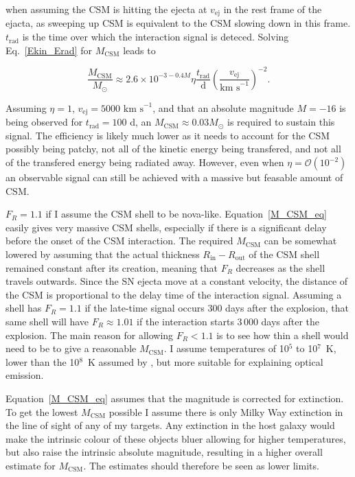\documentclass[a4paper,oneside,12pt, class=Latex/Classes/PhDthesisPSnPDF, crop=false]{standalone}
\begin{document}
when assuming the CSM is hitting the ejecta at $v_\text{ej}$ in the rest frame of the ejacta, as sweeping up CSM is equivalent to the CSM slowing down in this frame. $t_\text{rad}$ is the time over which the interaction signal is deteced. Solving Eq.~\ref{Ekin_Erad} for $M_\text{CSM}$ leads to

\begin{equation}
    \frac{M_\text{CSM}}{M_\odot} \approx 2.6\times 10^{-3-0.4M} \eta \frac{t_\text{rad}}{\text{d}}\left(\frac{v_\text{ej}}{\text{km s}^{-1}}\right)^{-2}.
\end{equation}

Assuming $\eta=1$, $v_\text{ej} = 5000\text{ km s}^{-1}$, and that an absolute magnitude $M=-16$ is being observed for $t_\text{rad}=100$ d, an $M_\text{CSM} \approx 0.03 M_\odot$ is required to sustain this signal. The efficiency is likely much lower as it needs to account for the CSM possibly being patchy, not all of the kinetic energy being transfered, and not all of the transfered energy being radiated away. However, even when $\eta = \mathcal{O}(10^{-2})$ an observable signal can still be achieved with a massive but feasable amount of CSM.

$F_R=1.1$ if I assume the CSM shell to be nova-like. Equation~\ref{M_CSM_eq} easily gives very massive CSM shells, especially if there is a significant delay before the onset of the CSM interaction. The required $M_\text{CSM}$ can be somewhat lowered by assuming that the actual thickness $R_\text{in} - R_\text{out}$ of the CSM shell remained constant after its creation, meaning that $F_R$ decreases as the shell travels outwards. Since the SN ejecta move at a constant velocity, the distance of the CSM is proportional to the delay time of the interaction signal. Assuming a shell has $F_R = 1.1$ if the late-time signal occurs 300 days after the explosion, that same shell will have $F_R \approx 1.01$ if the interaction starts 3\,000 days after the explosion. The main reason for allowing $F_R < 1.1$ is to see how thin a shell would need to be to give a reasonable $M_\text{CSM}$. I assume temperatures of 10$^5$ to 10$^7$~K, lower than the 10$^8$~K assumed by \cite{2015cp}, but more suitable for explaining optical emission.

Equation~\ref{M_CSM_eq} assumes that the magnitude is corrected for extinction. To get the lowest $M_\text{CSM}$ possible I assume there is only Milky Way extinction in the line of sight of any of my targets. Any extinction in the host galaxy would make the intrinsic colour of these objects bluer allowing for higher temperatures, but also raise the intrinsic absolute magnitude, resulting in a higher overall estimate for $M_\text{CSM}$. The estimates should therefore be seen as lower limits.\\
\end{document}

